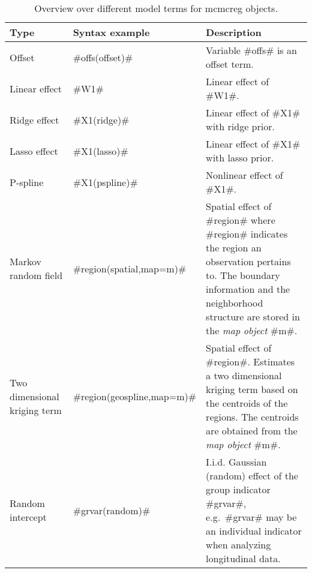 \begin{table}[ht] \footnotesize
\begin{center}
\begin{tabular}{|p{2.8cm}|p{3.6cm}|p{7.1cm}|}
\hline
{\bf Type} & {\bf Syntax example} & {\bf Description} \\
\hline \hline
Offset & #offs(offset)#  & Variable #offs# is an offset term. \\
\hline
Linear effect & #W1#  & Linear effect of #W1#. \\
\hline
Ridge effect & #X1(ridge)#  & Linear effect of #X1# with ridge prior. \\
\hline
Lasso effect & #X1(lasso)#  & Linear effect of #X1# with lasso prior. \\
\hline
P-spline &  #X1(pspline)#   & Nonlinear effect of #X1#.  \\
\hline Markov random \newline field &  #region(spatial,map=m)#  &
Spatial effect of #region# where #region# indicates the region an
observation pertains to. The boundary information and the
neighborhood structure are stored in the {\em map object}
#m#. \\
\hline Two dimensional \newline kriging term &
#region(geospline,map=m)# & Spatial effect of #region#. Estimates
a two dimensional kriging term
based on the centroids of the regions. The centroids are obtained from the {\em map object} #m#. \\
\hline Random intercept &  #grvar(random)# & I.i.d. Gaussian
(random) effect of the group indicator #grvar#,
e.g.~#grvar# may be an individual indicator when analyzing longitudinal data.  \\
\hline
\end{tabular}
{\em\caption {\label{mcmcterms} Overview over different model terms
for mcmcreg objects.}}
\end{center}
\end{table}



